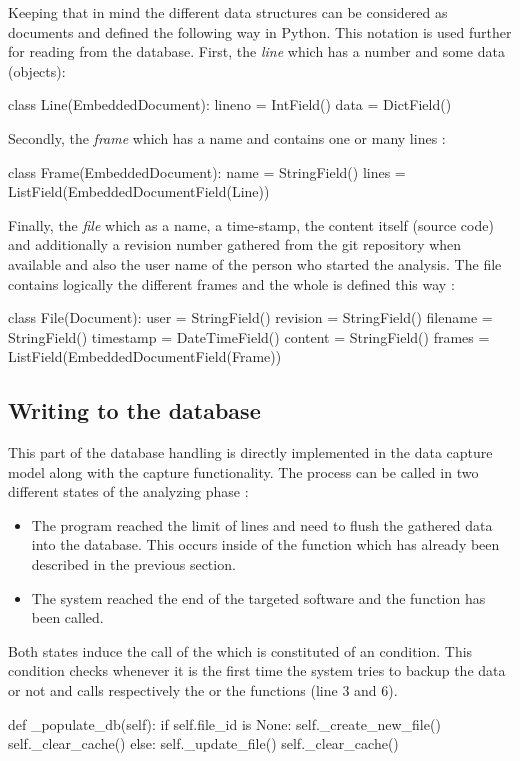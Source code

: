 Keeping that in mind the different data structures can be considered as documents and defined the following way in Python. This notation is used further for reading from the database. First, the \textit{line} which has a number and some data (objects):
\begin{python}
class Line(EmbeddedDocument):
    lineno = IntField()
    data = DictField()
\end{python}

Secondly, the \textit{frame} which has a name and contains one or many lines :

\begin{python}
class Frame(EmbeddedDocument):
    name = StringField()
    lines = ListField(EmbeddedDocumentField(Line))
\end{python}

Finally, the \textit{file} which as a name, a time-stamp, the content itself (source code) and additionally a revision number gathered from the git repository when available and also the user name of the person who started the analysis. The file contains logically the different frames and the whole is defined this way :
\begin{python}
class File(Document):
    user = StringField()
    revision = StringField()
    filename = StringField()
    timestamp = DateTimeField()
    content = StringField()
    frames = ListField(EmbeddedDocumentField(Frame))
\end{python}

\subsection{Writing to the database}
This part of the database handling is directly implemented in the data capture model along with the capture functionality. The process can be called in two different states of the analyzing phase : 
\begin{itemize}
  \item The program reached the limit of lines and need to flush the gathered data into the database. This occurs inside of the  function which has already been described in the previous section. 
  \item The system reached the end of the targeted software and the function  has been called.
\end{itemize}
Both states induce the call of the  which is constituted of an  condition. This condition checks whenever it is the first time the system tries to backup the data or not and calls respectively the  or the  functions (line 3 and 6).
\begin{python}
def _populate_db(self):
    if self.file_id is None:
        self._create_new_file()
        self._clear_cache()
    else:
        self._update_file()
        self._clear_cache()
\end{python}

